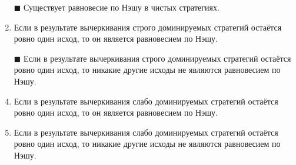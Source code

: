 \begin{enumerate}[label=$\square$]
	
	
	\item[$\blacksquare$] Существует равновесие по Нэшу в чистых стратегиях.
	\item Если в результате вычеркивания строго доминируемых стратегий остаётся ровно один исход, то он является равновесием по Нэшу.
	\item[$\blacksquare$] Если в результате вычеркивания строго доминируемых стратегий остаётся ровно один исход, то никакие другие исходы не являются равновесием по Нэшу.
	\item Если в результате вычеркивания слабо доминируемых стратегий остаётся ровно один исход, то он является равновесием по Нэшу.
	\item Если в результате вычеркивания слабо доминируемых стратегий остаётся ровно один исход, то никакие другие исходы не являются равновесием по Нэшу.
\end{enumerate}

